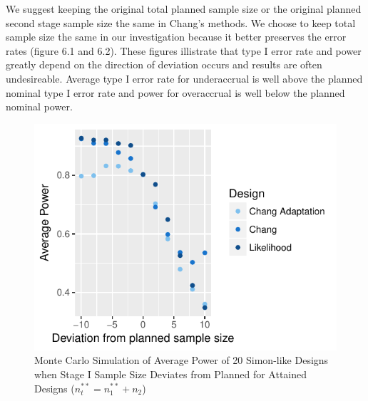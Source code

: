 \documentclass[12pt]{report}\usepackage[]{graphicx}\usepackage[]{color}
\newlength{\li}\setlength{\li}{14.48pt}
\newlength{\di}\setlength{\di}{-3.5mm}
\begin{document}
We suggest keeping the original total planned sample size or the original planned second stage sample size the same in Chang's methods. We choose to keep total sample size the same in our investigation because it better preserves the error rates (figure 6.1 and 6.2). These figures illistrate that type I error rate and power greatly depend on the direction of deviation occurs and results are often undesireable. Average type I error rate for underaccrual is well above the planned nominal type I error rate and power for overaccrual is well below the planned nominal power. 


\begin{figure}[]
\caption{Monte Carlo Simulation of Average Power of 20 Simon-like Designs when Stage I Sample Size Deviates from Planned for Attained Designs ($n_t^{\ast\ast} = n_1^{\ast\ast} + n_2$)}
\centering
\begin{Schunk}


\centerline{\includegraphics{unnamed-chunk-5-1} }

\end{Schunk}
\end{figure}
\end{document}
